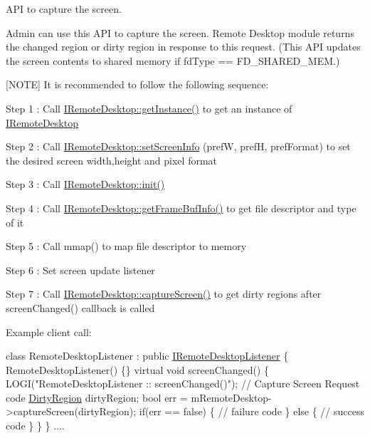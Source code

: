 \-A\-P\-I to capture the screen. 

\-Admin can use this \-A\-P\-I to capture the screen. \-Remote \-Desktop module returns the changed region or dirty region in response to this request. (\-This \-A\-P\-I updates the screen contents to shared memory if fd\-Type == \-F\-D\-\_\-\-S\-H\-A\-R\-E\-D\-\_\-\-M\-E\-M.)\par
 \mbox{[}\-N\-O\-T\-E\mbox{]} \-It is recommended to follow the following sequence\-:\par
 \-Step 1 \-: \-Call \hyperlink{classandroid_1_1IRemoteDesktop_a4686215ee98981d640bbc5ec100e42ca}{\-I\-Remote\-Desktop\-::get\-Instance()} to get an instance of \hyperlink{classandroid_1_1IRemoteDesktop}{\-I\-Remote\-Desktop}\par
 \-Step 2 \-: \-Call \hyperlink{classandroid_1_1IRemoteDesktop_ac0026eaa9da3215bfc418fbaa891ec0b}{\-I\-Remote\-Desktop\-::set\-Screen\-Info} (pref\-W, pref\-H, pref\-Format) to set the desired screen width,height and pixel format\par
 \-Step 3 \-: \-Call \hyperlink{classandroid_1_1IRemoteDesktop_a5792cf8c7fa9eeb8e21f39927d0fed1e}{\-I\-Remote\-Desktop\-::init()}\par
 \-Step 4 \-: \-Call \hyperlink{classandroid_1_1IRemoteDesktop_a684fcd14561744487bbc0b74a1e11ddb}{\-I\-Remote\-Desktop\-::get\-Frame\-Buf\-Info()} to get file descriptor and type of it\par
 \-Step 5 \-: \-Call mmap() to map file descriptor to memory\par
 \-Step 6 \-: \-Set screen update listener\par
 \-Step 7 \-: \-Call \hyperlink{classandroid_1_1IRemoteDesktop_af777e36a552194cf99e603351259b568}{\-I\-Remote\-Desktop\-::capture\-Screen()} to get dirty regions after screen\-Changed() callback is called\par
 

\-Example client call\-:


\begin{DoxyPre}
 class RemoteDesktopListener : public \hyperlink{classandroid_1_1IRemoteDesktopListener}{IRemoteDesktopListener} \{
 	 RemoteDesktopListener() \{\}
 	 virtual void screenChanged() \{
 		 LOGI("RemoteDesktopListener :: screenChanged()");
		   	 // Capture Screen Request code
			 \hyperlink{classandroid_1_1DirtyRegion}{DirtyRegion} dirtyRegion;
			 bool err = mRemoteDesktop->captureScreen(dirtyRegion);
			 if(err == false)  \{
				 // failure code
			\} else \{
				 // success code
			\}
		  \}
	   \}
	 ....\end{DoxyPre}



